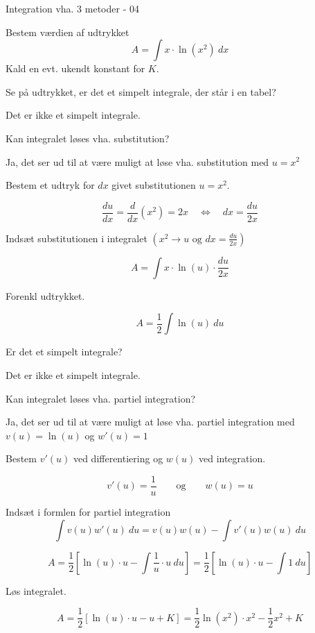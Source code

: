 \documentclass{article}
\begin{document}
\begin{exercise}{Integration vha. 3 metoder - 04}

Bestem værdien af udtrykket
\[
A = \int x \cdot \ln(x^2) \ dx
\]
Kald en evt. ukendt konstant for $K$.



\hint
Se på udtrykket, er det et simpelt integrale, der står i en tabel?

\hint
Det er ikke et simpelt integrale.

\hint
Kan integralet løses vha. substitution?

\hint
Ja, det ser ud til at være muligt at løse vha. substitution med $u=x^2$

\hint
Bestem et udtryk for $dx$ givet substitutionen $u=x^2$.

\hint
\[
\frac{du}{dx} = \frac{d}{dx} \left(x^2 \right) = 2x \quad \Leftrightarrow \quad dx = \frac{du}{2x}
\]

\hint
Indsæt substitutionen i integralet $\left(x^2 \rightarrow u \textrm{ og } dx = \frac{du}{2x} \right)$

\hint
\[
A = \int x \cdot \ln(u) \cdot \frac{du}{2x}
\]

\hint
Forenkl udtrykket.

\hint
\[
A= \frac{1}{2} \int \ln(u) \ du
\]

\hint
Er det et simpelt integrale?

\hint
Det er ikke et simpelt integrale.

\hint
Kan integralet løses vha. partiel integration?

\hint
Ja, det ser ud til at være muligt at løse vha. partiel integration med $v(u) = \ln(u)$ og $w'(u) = 1$

\hint
Bestem $v'(u)$ ved differentiering og $w(u)$ ved integration.

\hint
\[
v'(u) = \frac{1}{u} \qquad \textrm{og} \qquad w(u) = u
\]

\hint
Indsæt i formlen for partiel integration
\[
 \int v(u) w'(u) \ du = v(u) w(u) - \int v'(u) w(u) \ du
\]

\hint
\[
A = \frac{1}{2} \left[ \ln(u) \cdot u - \int \frac{1}{u} \cdot u \ du \right] = \frac{1}{2} \left[ \ln(u) \cdot u - \int 1 \ du \right]
\]

\hint
Løs integralet.

\hint
\[
A = \frac{1}{2} \left[ \ln(u) \cdot u - u + K \right] = \frac{1}{2} \ln(x^2) \cdot x^2 - \frac{1}{2} x^2 + K
\]


\end{exercise}
\end{document}
